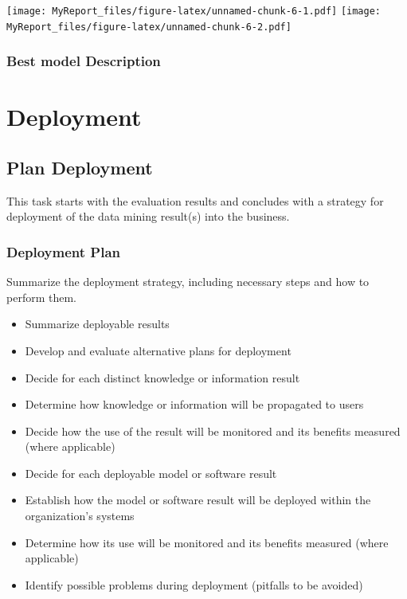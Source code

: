 \documentclass[
]{article}
\providecommand{\tightlist}{%
  \setlength{\itemsep}{0pt}\setlength{\parskip}{0pt}}
\begin{document}
\texttt{[image: MyReport\_files/figure-latex/unnamed-chunk-6-1.pdf]}
\texttt{[image: MyReport\_files/figure-latex/unnamed-chunk-6-2.pdf]}

\hypertarget{best-model-description}{%
\subsubsection{Best model Description}\label{best-model-description}}

\hypertarget{deployment}{%
\section{Deployment}\label{deployment}}

\hypertarget{plan-deployment}{%
\subsection{Plan Deployment}\label{plan-deployment}}

This task starts with the evaluation results and concludes with a
strategy for deployment of the data mining result(s) into the business.

\hypertarget{deployment-plan}{%
\subsubsection{Deployment Plan}\label{deployment-plan}}

Summarize the deployment strategy, including necessary steps and how to
perform them.

\begin{itemize}
\tightlist
\item
  Summarize deployable results
\item
  Develop and evaluate alternative plans for deployment
\item
  Decide for each distinct knowledge or information result
\item
  Determine how knowledge or information will be propagated to users
\item
  Decide how the use of the result will be monitored and its benefits
  measured (where applicable)
\item
  Decide for each deployable model or software result
\item
  Establish how the model or software result will be deployed within the
  organization's systems
\item
  Determine how its use will be monitored and its benefits measured
  (where applicable)
\item
  Identify possible problems during deployment (pitfalls to be avoided)
\end{itemize}
\end{document}
